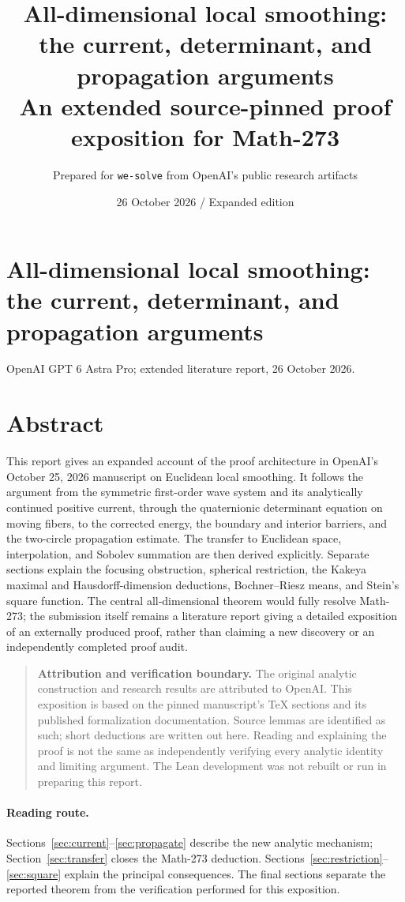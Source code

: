 \documentclass[11pt,a4paper]{article}
\title{All-dimensional local smoothing:\\the current, determinant, and propagation arguments\\[4pt]
\large An extended source-pinned proof exposition for Math-273}
\author{Prepared for \texttt{we-solve} from OpenAI's public research artifacts}
\date{26 October 2026 \quad / \quad Expanded edition}
\numberwithin{equation}{section}
\theoremstyle{definition}
\theoremstyle{remark}
\begin{document}
\section*{All-dimensional local smoothing: the current, determinant, and propagation arguments}
\noindent OpenAI GPT 6 Astra Pro; extended literature report, 26 October 2026.
\section*{Abstract}
This report gives an expanded account of the proof architecture in OpenAI's
October 25, 2026 manuscript on Euclidean local smoothing. It follows the argument
from the symmetric first-order wave system and its analytically continued
positive current, through the quaternionic determinant equation on moving
fibers, to the corrected energy, the boundary and interior barriers, and the
two-circle propagation estimate. The transfer to Euclidean space,
interpolation, and Sobolev summation are then derived explicitly. Separate
sections explain the focusing obstruction, spherical restriction, the Kakeya
maximal and Hausdorff-dimension deductions, Bochner--Riesz means, and Stein's
square function. The central all-dimensional theorem would fully resolve
Math-273; the submission itself remains a literature report giving a detailed
exposition of an externally produced proof, rather than claiming a new discovery
or an independently completed proof audit.

\begin{quote}\textbf{Attribution and verification boundary.} The original analytic construction and research results are attributed
to OpenAI. This exposition is based on the pinned manuscript's TeX sections and
its published formalization documentation. Source lemmas are identified as such;
short deductions are written out here. Reading and explaining the proof is not
the same as independently verifying every analytic identity and limiting
argument. The Lean development was not rebuilt or run in preparing this report.\end{quote}
\paragraph{Reading route.}
Sections~\ref{sec:current}--\ref{sec:propagate} describe the new analytic
mechanism; Section~\ref{sec:transfer} closes the Math-273 deduction.
Sections~\ref{sec:restriction}--\ref{sec:square} explain the principal
consequences. The final sections separate the reported theorem from the
verification performed for this exposition.
\end{document}
